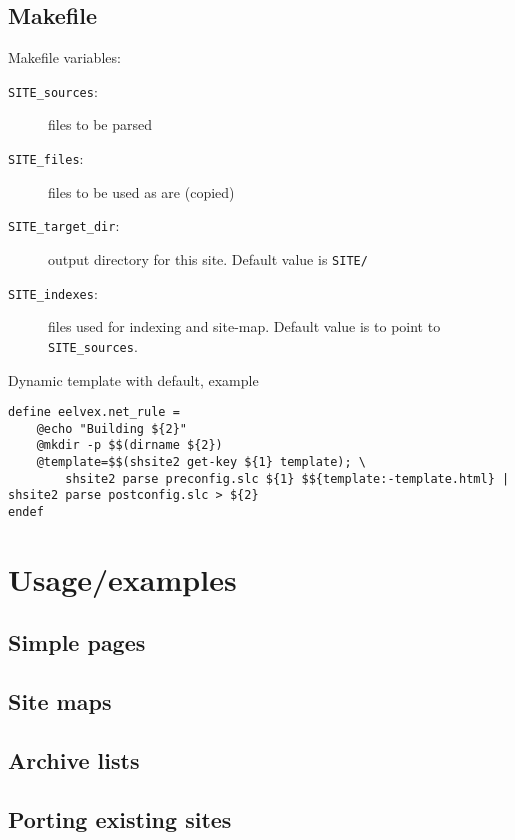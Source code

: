 \documentclass{memoir}
\begin{document}
\section{Makefile} %

Makefile variables:
\begin{description}
\item[\texttt{SITE\_sources}:] files to be parsed
\item[\texttt{SITE\_files}:] files to be used as are (copied)
\item[\texttt{SITE\_target\_dir}:] output directory for this site. Default value is \texttt{SITE/}
\item[\texttt{SITE\_indexes}:] files used for indexing and site-map. Default value is to point to \texttt{SITE\_sources}.
\end{description}

Dynamic template with default, example
\tabson
\begin{verbatim}
define eelvex.net_rule =
	@echo "Building ${2}"
	@mkdir -p $$(dirname ${2})
	@template=$$(shsite2 get-key ${1} template); \
		shsite2 parse preconfig.slc ${1} $${template:-template.html} | shsite2 parse postconfig.slc > ${2}
endef
\end{verbatim}





\chapter{Usage/examples} %

	\section{Simple pages} %


	\section{Site maps} %


	\section{Archive lists} %


	\section{Porting existing sites} %
\end{document}
